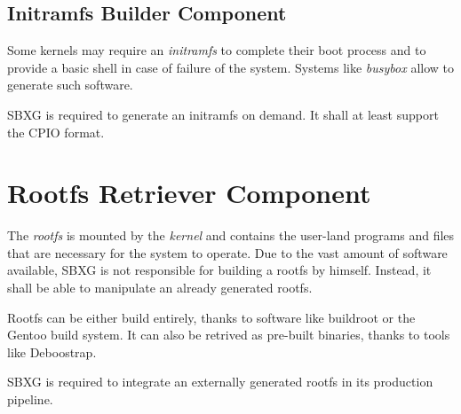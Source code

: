 \documentclass{article}
\begin{document}
\subsection{Initramfs Builder Component}

Some kernels may require an \emph{initramfs} to complete their boot process and
to provide a basic shell in case of failure of the system. Systems like
\emph{busybox} allow to generate such software.

\begin{requirement}
  SBXG is required to generate an initramfs on demand. It shall at least support
  the CPIO format.
\end{requirement}

\begin{center}
\end{center}

\section{Rootfs Retriever Component}

The \emph{rootfs} is mounted by the \emph{kernel} and contains the user-land
programs and files that are necessary for the system to operate. Due to the vast
amount of software available, SBXG is not responsible for building a rootfs by
himself. Instead, it shall be able to manipulate an already generated rootfs.

Rootfs can be either build entirely, thanks to software like buildroot or the
Gentoo build system. It can also be retrived as pre-built binaries, thanks to
tools like Deboostrap.

\begin{requirement}
  SBXG is required to integrate an externally generated rootfs in its production
  pipeline.
\end{requirement}
\end{document}
